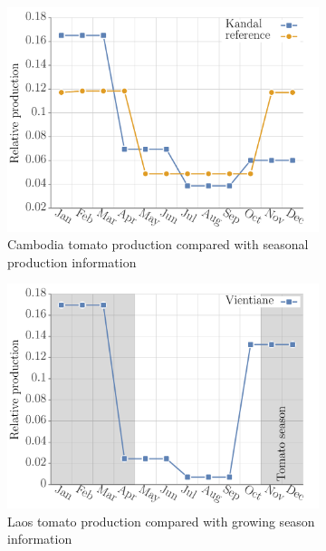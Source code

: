\documentclass[10pt]{article}
\theoremstyle{definition}
\begin{document}
\begin{figure}[!ht]
\begin{subfigure}[b]{.32\textwidth}
\includegraphics[width=\textwidth]{../production/results/prod_tomato_KHM.pdf}
\caption{Cambodia tomato production compared with seasonal production
    information~\cite{genova2006postharvest}}
\end{subfigure}
\begin{subfigure}[b]{.32\textwidth}
\includegraphics[width=\textwidth]{../production/results/prod_tomato_LAO.pdf}
\caption{Laos tomato production compared with growing season
    information~\cite{kethonga2004}}
\end{subfigure}
\begin{subfigure}[b]{.32\textwidth}

\end{subfigure}
\end{figure}
\end{document}

